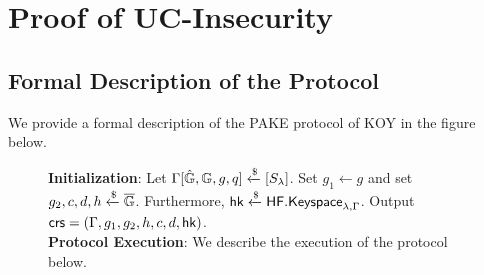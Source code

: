 
\section{Proof of UC-Insecurity}

\subsection{Formal Description of the Protocol}

We provide a formal description of the PAKE protocol of KOY in the figure below.

	\begin{figure}[tbp]
	\begin{framed}\small

		\textbf{Initialization}: Let $\Gamma[\hat{\mathbb{G}},\mathbb{G},g,q]\xleftarrow{\$}[S_\lambda]$. Set $g_1\gets g$ and set $g_2, c, d, h\xleftarrow{\$}\overline{\mathbb{G}}$. Furthermore, $\mathsf{hk}\xleftarrow{\$}\mathsf{HF.Keyspace}_{\lambda,\Gamma}$. Output $\mathsf{crs} = (\Gamma,g_1, g_2,h,c,d,\mathsf{hk})$.\\
		
		\textbf{Protocol Execution}: We describe the execution of the protocol below.
		

\end{framed}
\end{figure}
